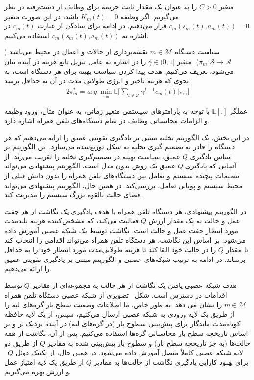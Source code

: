 متغیر $C > 0$ را به عنوان یک مقدار ثابت جریمه برای وظایف از دست‌رفته در نظر می‌گیریم. اگر وظیفه $K_m(t)=0$ باشد، در این صورت متغیر  $c_m(s_m(t),a_m(t))=0$ قرار می‌دهیم. در ادامه برای سادگی از عبارت $c_m(t)$ در اشاره به $c_m(s_m(t),a_m(t))$ استفاده می‌کنیم. 





سیاست دستگاه $m \in \mathcal{M}$ نقشه‌برداری از حالات و اعمال در محیط می‌باشد ($\pi_m : \mathcal{S} \rightarrow \mathcal{A}$). متغیر $\gamma \in (0,1]$ را در اشاره به عامل تنزیل تابع هزینه در آینده بیان می‌شود، تعریف می‌کنیم. هدف پیدا کردن سیاست بهینه برای هر دستگاه است، به نحوی که هزینه تاخیر و انرژی طولانی مدت در آن به حداقل برسد. 
\begin{alignat}{2}
	\pi_m^* = arg\  \min\limits_{\pi_m}  \mathbb{E} \Bigg[ \sum\limits_{t \in \mathcal{T}} \gamma^{t-1}c_m(t) \Bigg| \pi_m \Bigg]
	\label{19}  
\end{alignat}


عملگر $\mathbb{E}[.]$ با توجه به پارامترهای سیستمی متغیر زمانی، به عنوان مثال، ورود وظیفه و الزامات محاسباتی وظایف در تمام دستگاه‌های تلفن همراه اشاره دارد. 


در این بخش، یک الگوریتم تخلیه مبتنی بر یادگیری تقویتی عمیق را ارایه می‌دهیم که هر دستگاه را قادر به تصمیم گیری تخلیه به شکل توزیع‌شده می‌سازد. این الگوریتم بر اساس یادگیری $Q$ عمیق، سیاست بهینه در تصمیم‌گیری تخلیه را تقریب می‌زند. از آنجایی که یادگیری $Q$ عمیق یک روش بدون مدل است، الگوریتم پیشنهادی می‌تواند تنظیمات پیچیده سیستم و تعامل بین دستگاه‌های تلفن همراه را بدون دانش قبلی از محیط سیستم و پویایی تعامل، بررسی‌کند. در همین حال، الگوریتم پیشنهادی می‌تواند فضای حالت بالقوه بزرگ سیستم را مدیریت کند.

در الگوریتم پیشنهادی، هر دستگاه تلفن همراه با هدف یادگیری یک نگاشت از
هر جفت عمل و حالت به یک مقدار ارزش $Q$ فعالیت می‌کند، که مشخص‌کننده هزینه بلندمدت مورد انتظار جفت عمل و حالت است. نگاشت توسط یک شبکه عصبی آموزش داده می‌شود. بر اساس این نگاشت، هر دستگاه تلفن همراه می‌تواند اقدامی را انتخاب کند تا مقدار $Q$ را در حالت خود القا کند تا هزینه طولانی‌مدت مورد انتظار خود را به حداقل برساند. در ادامه به ترتیب شبکه‌های عصبی و الگوریتم مبتنی بر یادگیری تقویتی عمیق را ارائه می‌دهیم.



هدف شبکه عصبی یافتن یک نگاشت از هر حالت به مجموعه‌ای از مقادیر $Q$ توسط اقدامات در دسترس است. شکل~ تصویری از شبکه عصبی دستگاه تلفن همراه $m \in \mathcal{M}$ را نشان می دهد. به طور خاص، ما اطلاعات وضعیت سطح بار گره‌های لبه را از طریق یک لایه ورودی به شبکه عصبی ارسال می‌کنیم،
سپس، از یک لایه حافظه کوتاه‌مدت ماندگار برای پیش‌بینی سطوح بار (در گره‌های لبه) در آینده نزدیک بر و بر اساس تاریخچه سطح بار محاسباتی گره‌ها استفاده می‌کنیم. پس از آن، نگاشت از همه حالت‌ها (به جز تاریخچه سطح بار) و سطوح بار پیش‌بینی شده به مقادیر $Q$ از طریق دو لایه شبکه عصبی کاملاً متصل آموزش داده می‌شود. در همین حال، از تکنیک دوئل $Q$~\cite{wang2016dueling} برای بهبود کارایی یادگیری نگاشت از حالت‌ها به مقادیر $Q$ از طریق یک لایه امتیاز-عمل و ارزش بهره می‌گیریم. 


